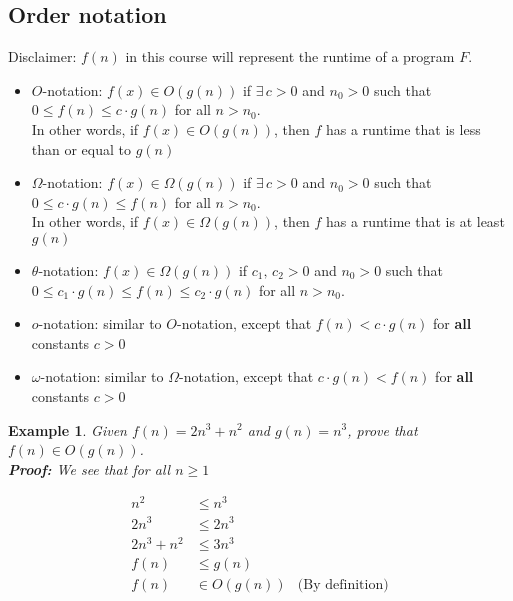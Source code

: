 \documentclass{report}
\newtheorem{ex}{Example}[section]
\begin{document}
\subsection{Order notation}
Disclaimer: $f(n)$ in this course will represent the runtime of a program $F$.
\begin{itemize}
\item $O$-notation: $f(x) \in O(g(n))$ if $\exists \, c > 0$ and $n_0 > 0$ such that $0 \leq f(n) \leq c \cdot g(n)$ for all $n > n_0$.\\In other words, if $f(x) \in O(g(n))$, then $f$ has a runtime that is less than or equal to $g(n)$
\item $\Omega$-notation: $f(x) \in \Omega(g(n))$ if $\exists \, c > 0$ and $n_0 > 0$ such that $0 \leq c \cdot g(n) \leq f(n)$ for all $n > n_0$.\\In other words, if $f(x) \in \Omega(g(n))$, then $f$ has a runtime that is at least $g(n)$
\item $\theta$-notation: $f(x) \in \Omega(g(n))$ if $c_1, \, c_2 > 0$ and $n_0 > 0$ such that $0 \leq c_1 \cdot g(n) \leq f(n) \leq c_2 \cdot g(n)$ for all $n > n_0$.
\item $o$-notation: similar to $O$-notation, except that $f(n) < c \cdot g(n)$ for \textbf{all} constants $c > 0$
\item $\omega$-notation: similar to $\Omega$-notation, except that $c \cdot g(n) < f(n)$ for \textbf{all} constants $c > 0$
\end{itemize}
\begin{ex}
Given $f(n) = 2n^3 + n^2$ and $g(n) = n^3$, prove that $f(n) \in O(g(n))$. \\
\textbf{Proof:} We see that for all $n \geq 1$
\end{ex}
\begin{align}
n^2 &\leq n^3 \\
2n^3 &\leq 2n^3 \\
2n^3 + n ^2 &\leq 3n^3 \\
f(n) &\leq g(n) \\
f(n) &\in O(g(n)) & \text{(By definition)}
\end{align}
\end{document}
